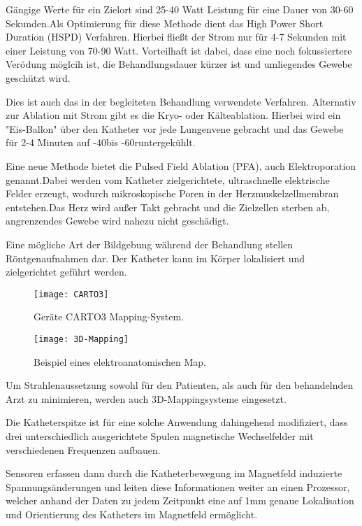 \documentclass[11pt,a4paper,titlepage]{scrartcl}
\begin{document}
Gängige Werte für ein Zielort sind 25-40 Watt Leistung für eine Dauer von 30-60 Sekunden.Als Optimierung für diese Methode dient das High Power Short Duration (HSPD) Verfahren. Hierbei fließt der Strom nur für 4-7 Sekunden mit einer Leistung von 70-90 Watt. Vorteilhaft ist dabei, dass eine noch fokussiertere Verödung möglcih ist, die Behandlungsdauer kürzer ist und umliegendes Gewebe geschützt wird. \medskip

Dies ist auch das in der begleiteten Behandlung verwendete Verfahren. Alternativ zur Ablation mit Strom gibt es die Kryo- oder Kälteablation. Hierbei wird ein "Eis-Ballon" über den Katheter vor jede Lungenvene gebracht und das Gewebe für 2-4 Minuten auf -40\textcelsius bis -60\textcelsius runtergekühlt. \medskip

Eine neue Methode bietet die Pulsed Field Ablation (PFA), auch Elektroporation genannt.Dabei werden vom Katheter zielgerichtete, ultraschnelle elektrische Felder erzeugt, wodurch mikroskopische Poren in der Herzmuskelzellmembran entstehen.Das Herz wird außer Takt gebracht und die Zielzellen sterben ab, angrenzendes Gewebe wird nahezu nicht geschädigt. \medskip

Eine mögliche Art der Bildgebung während der Behandlung stellen Röntgenaufnahmen dar. Der Katheter kann im Körper lokalisiert und zielgerichtet geführt werden. \medskip

    \begin{figure}
        \centering
        \caption{Geräte CARTO3 Mapping-System.}
        \label{carto}
        \texttt{[image: CARTO3]}
        \centering
        \end{figure}
    \begin{figure}
        \centering
        \caption{Beispiel eines elektroanatomischen Map.}
        \label{map}
        \texttt{[image: 3D-Mapping]}
        \centering
        \end{figure}

\newpage

Um Strahlenaussetzung sowohl für den Patienten, als auch für den behandelnden Arzt zu minimieren, werden auch 3D-Mappingsysteme eingesetzt. \medskip

Die Katheterspitze ist für eine solche Anwendung dahingehend modifiziert, dass drei unterschiedlich ausgerichtete Spulen magnetische Wechselfelder mit verschiedenen Frequenzen aufbauen. \medskip

Sensoren erfassen dann durch die Katheterbewegung im Magnetfeld induzierte Spannungsänderungen und leiten diese Informationen weiter an einen Prozessor, welcher anhand der Daten zu jedem Zeitpunkt eine auf 1mm genaue Lokalisation und Orientierung des Katheters im Magnetfeld ermöglicht. \medskip
\end{document}
